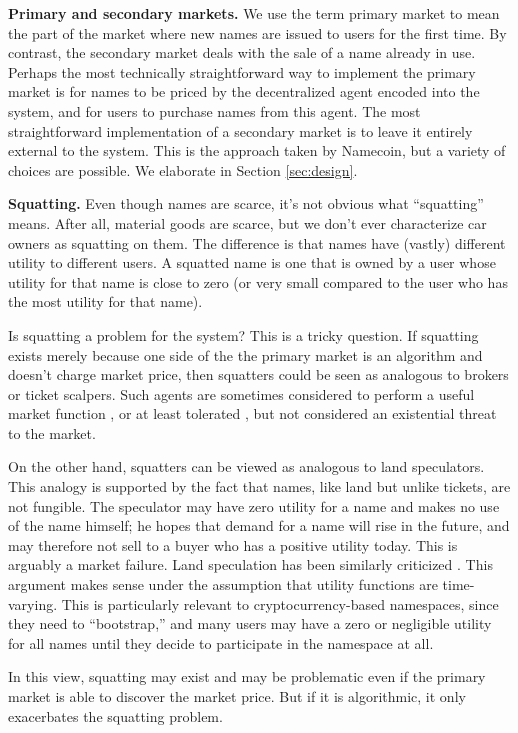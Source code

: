 {\bf Primary and secondary markets.} We use the term primary market to mean the part of the market where new names are issued to users for the first time. By contrast, the secondary market deals with the sale of a name already in use. Perhaps the most technically straightforward way to implement the primary market is for names to be priced by the decentralized agent encoded into the system, and for users to purchase names from this agent. The most straightforward implementation of a secondary market is to leave it entirely external to the system. This is the approach taken by Namecoin, but a variety of choices are possible. We elaborate in Section \ref{sec:design}.

{\bf Squatting.} Even though names are scarce, it's not obvious what ``squatting'' means. After all, material goods are scarce, but we don't ever characterize car owners as squatting on them. The difference is that names have (vastly) different utility to different users. A squatted name is one that is owned by a user whose utility for that name is close to zero (or very small compared to the user who has the most utility for that name).

Is squatting a problem for the system? This is a tricky question. If squatting exists merely because one side of the the primary market is an algorithm and doesn’t charge market price, then squatters could be seen as analogous to brokers or ticket scalpers. Such agents are sometimes considered to perform a useful market function \cite{}, or at least tolerated \cite{}, but not considered an existential threat to the market.

On the other hand, squatters can be viewed as analogous to land speculators. This analogy is supported by the fact that names, like land but unlike tickets, are not fungible. The speculator may have zero utility for a name and makes no use of the name himself; he hopes that demand for a name will rise in the future, and may therefore not sell to a buyer who has a positive utility today. This is arguably a market failure. Land speculation has been similarly criticized \cite{archer73}. This argument makes sense under the assumption that utility functions are time-varying. This is particularly relevant to cryptocurrency-based namespaces, since they need to ``bootstrap,'' \hi{[explain]} and many users may have a zero or negligible utility for all names until they decide to participate in the namespace at all.

In this view, squatting may exist and may be problematic even if the primary market is able to discover the market price. But if it is algorithmic, it only exacerbates the squatting problem.


